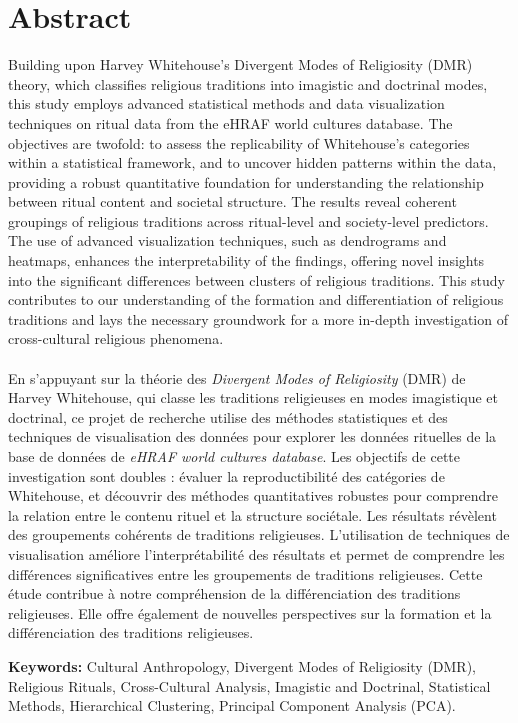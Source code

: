 \documentclass[12pt]{report}
\begin{document}
	\chapter*{Abstract}
	Building upon Harvey Whitehouse's Divergent Modes of Religiosity (DMR) theory, which classifies religious traditions into imagistic and doctrinal modes, this study employs advanced statistical methods and data visualization techniques on ritual data from the eHRAF world cultures database. The objectives are twofold: to assess the replicability of Whitehouse's categories within a statistical framework, and to uncover hidden patterns within the data, providing a robust quantitative foundation for understanding the relationship between ritual content and societal structure. The results reveal coherent groupings of religious traditions across ritual-level and society-level predictors. The use of advanced visualization techniques, such as dendrograms and heatmaps, enhances the interpretability of the findings, offering novel insights into the significant differences between clusters of religious traditions. This study contributes to our understanding of the formation and differentiation of religious traditions and lays the necessary groundwork for a more in-depth investigation of cross-cultural religious phenomena.\\
	\\
	\noindent En s'appuyant sur la théorie des \textit{Divergent Modes of Religiosity} (DMR) de Harvey Whitehouse, qui classe les traditions religieuses en modes imagistique et doctrinal, ce projet de recherche utilise des méthodes statistiques et des techniques de visualisation des données pour explorer les données rituelles de la base de données de \textit{eHRAF world cultures database}. Les objectifs de cette investigation sont doubles : évaluer la reproductibilité des catégories de Whitehouse, et découvrir des méthodes quantitatives robustes pour comprendre la relation entre le contenu rituel et la structure sociétale. Les résultats révèlent des groupements cohérents de traditions religieuses. L'utilisation de techniques de visualisation améliore l'interprétabilité des résultats et permet de comprendre les différences significatives entre les groupements de traditions religieuses. Cette étude contribue à notre compréhension de la différenciation des traditions religieuses. Elle offre également de nouvelles perspectives sur la formation et la différenciation des traditions religieuses. 
	
	\vspace{0.5cm}
	\noindent\textbf{Keywords:} Cultural Anthropology, Divergent Modes of Religiosity (DMR), Religious Rituals, Cross-Cultural Analysis, Imagistic and Doctrinal, Statistical Methods, Hierarchical Clustering, Principal Component Analysis (PCA).
	
\end{document}
